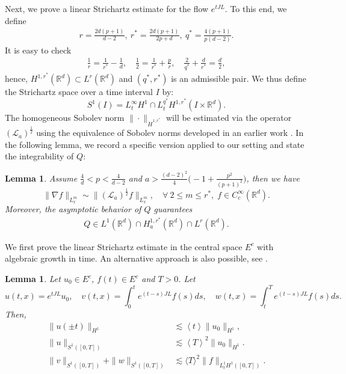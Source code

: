 \documentclass[12pt]{amsart}
\newcommand{\R}{\mathbb R}
\newcommand{\la}{\mathcal L_a}
\newcommand{\lsm}{\lesssim}
\newtheorem{lemma}[theorem]{Lemma}
\begin{document}
Next, we prove a linear Strichartz estimate for the flow $e^{tJL}$. To this end, we define 
\begin{align}\label{qqstar}
r=\tfrac{2d(p+1)}{d-2},\ r^*=\tfrac{2d(p+1)}{2p+d}, \ q^*=\tfrac{4{(p+1)}}{p(d-2)}. 
\end{align}
It is easy to check 
\begin{align}\label{jj5}
\tfrac 1r = \tfrac 1{r^*} - \tfrac 1d, \quad  \tfrac 12=\tfrac 1{r^*}+\tfrac pr,\quad \tfrac 2{q^*}+\tfrac d{r^*}=\tfrac d2, 
\end{align}
hence, $H^{1, r^*}(\R^d)\subset L^r (\R^d)$ and $(q^*,r^*)$ is an admissible pair. We thus define the Strichartz space over a time interval $I$ by: 
\begin{equation}\label{snorm}
S^1(I)=L_t^\infty H^1\cap L_t^{q^*}  H^{1,r^*}(I\times\R^d). 
\end{equation}
The homogeneous Sobolev norm $\|\cdot \|_{\dot H^{1, r^*}}$ will be estimated via the operator $(\la)^{\frac12}$  
using the equivalence of Sobolev norms developed in an earlier work \cite{KMVZZ18}. In the following lemma, we record a specific version applied to our setting and state the integrability of $Q$:

\begin{lemma}\label{lm: normequal}
Assume $\tfrac 4d<p<\tfrac 4{d-2}$ and $a> \tfrac{(d-2)^2}4\bigl(-1+\frac{p^2}{(p+1)^2}\bigr)$, then we have 
\[
\|\nabla f\|_{L_x^m}\sim \|(\la)^{\frac 12} f\|_{L_x^m}, \quad  \forall \ 2\le m\le r^*, \; f\in C_c^\infty(\R^d). 
\]
Moreover, the asymptotic behavior of $Q$ guarantees
\begin{align}\label{qspace}
Q\in L^1(\R^d)\cap H_a^{1,r^*}(\R^d)\cap L^r (\R^d). 
\end{align}
\end{lemma}


We first prove the linear Strichartz estimate in the central space $E^c$ with algebraic growth in time. 
 An alternative approach is also possible, see \cite{YZ22}.

\begin{lemma}\label{Lemma3.1}
	Let $u_0\in E^c$, $f(t)\in E^c$ and $T>0$. Let 
\[u(t,x)=e^{tJL} u_0, \quad v(t,x)=\int_0^t e^{(t-s)JL}f(s)ds,\quad w(t,x)=\int_t^T e^{(t-s)JL}f(s)ds.\]
Then,  
	\begin{align}
		\|u(\pm t)\|_{ H^1} &\lesssim \left\langle t \right\rangle \|u_0\|_{ H^1}, \label{H1bd}\\
		\|u\|_{ S^1([0,T])} &\lesssim \left\langle T \right \rangle^2 \|u_0\|_{ H^1}. \label{local u}\\
		\|v\|_{ S^1([0,T])}+\|w\|_{ S^1([0,T])}&\lsm \langle T\rangle ^2 \|f\|_{L_t^1 H^1([0,T])}. \label{918}
	\end{align}
\end{lemma}
\end{document}
